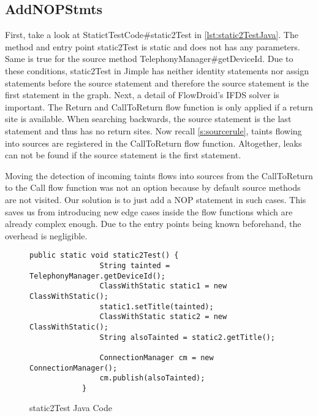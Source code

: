 \documentclass[../draft.tex]{subfiles}
\begin{document}
    \subsection{AddNOPStmts}
    First, take a look at StatictTestCode\#static2Test in \autoref{lst:static2TestJava}. The method and entry point static2Test is static and does not has any parameters. Same is true for the source method TelephonyManager\#getDeviceId. Due to these conditions, static2Test in Jimple has neither identity statements nor assign statements before the source statement and therefore the source statement is the first statement in the graph. 
    Next, a detail of FlowDroid's IFDS solver is important. The Return and CallToReturn flow function is only applied if a return site is available. When searching backwards, the source statement is the last statement and thus has no return sites. Now recall \autoref{s:sourcerule}, taints flowing into sources are registered in the CallToReturn flow function. Altogether, leaks can not be found if the source statement is the first statement.

    Moving the detection of incoming taints flows into sources from the CallToReturn to the Call flow function was not an option because by default source methods are not visited. 
    Our solution is to just add a NOP statement in such cases. This saves us from introducing new edge cases inside the flow functions which are already complex enough. Due to the entry points being known beforehand, the overhead is negligible.

    \begin{figure}
        \centering
        \begin{lstlisting}[gobble=16]
            public static void static2Test() {
                String tainted = TelephonyManager.getDeviceId();
                ClassWithStatic static1 = new ClassWithStatic();
                static1.setTitle(tainted);
                ClassWithStatic static2 = new ClassWithStatic();
                String alsoTainted = static2.getTitle();
                
                ConnectionManager cm = new ConnectionManager();
                cm.publish(alsoTainted);
            }
        \end{lstlisting}
        \caption{static2Test Java Code}
        \label{lst:static2TestJava}
    \end{figure}
\end{document}
